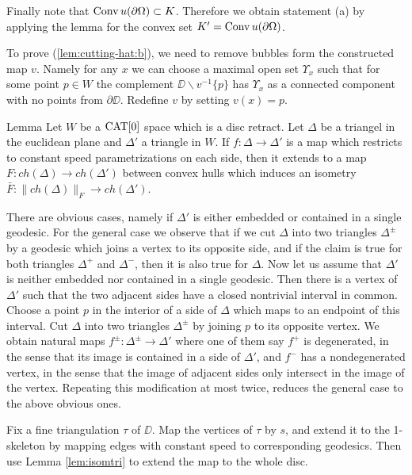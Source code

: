 \documentclass[a4paper,10pt]{amsart}
\begin{document}
Finally note that $\mathop{\rm Conv}\nolimits u(\partial\Omega)\subset K$. 
Therefore we obtain statement (a) 
by applying the lemma for the convex set $K'=\mathop{\rm Conv}\nolimits u(\partial\Omega)$.

To prove (\ref{lem:cutting-hat:b}), we need to remove bubbles form the constructed map $v$.
Namely for any $x$ we can choose a maximal open set $\Upsilon_x$ such that for some point $p\in W$ the complement $\DD\backslash v^{-1}\{p\}$ has $\Upsilon_x$ as a
connected component with no points from $\partial \DD$.
Redefine $v$ by setting $v(x)=p$.
\qeds

\begin{thm}{Lemma}\label{lem:isomtri}
Let $W$ be a $\mathop{\rm CAT}\nolimits[0]$ space which is a disc retract. Let $\Delta$ be a triangel in the euclidean plane
and $\Delta'$ a triangle in $W$. If $f:\Delta\to \Delta'$ is a map which restricts to constant speed
parametrizations on each side, then it extends to a map 
$F:ch(\Delta)\to ch(\Delta')$ between convex hulls which induces an isometry $\bar F:\|ch(\Delta)\|_F\to ch(\Delta')$. 
\end{thm}

There are obvious cases, namely if $\Delta'$ is either embedded or contained in a single geodesic. 
For the general case we observe that if we cut $\Delta$ into two triangles $\Delta^\pm$ by a geodesic which joins a vertex to its opposite side, and if 
the claim is true for both triangles $\Delta^+$ and $\Delta^-$, then it is also true for $\Delta$. Now let us assume that $\Delta'$ is neither embedded nor contained
in a single geodesic. Then there is a vertex of $\Delta'$ such that the two adjacent sides have a closed nontrivial interval in common. Choose a point $p$ in the interior
of a side of $\Delta$ which maps to an endpoint of this interval. Cut $\Delta$ into two triangles $\Delta^\pm$ by joining $p$ to its opposite vertex.
We obtain natural maps $f^\pm:\Delta^\pm\to\Delta'$ where one of them say $f^+$ is degenerated, in the sense that its image is contained in a side of $\Delta'$, and $f^-$ has 
a nondegenerated vertex, in the sense that the image of adjacent sides only intersect in the image of the vertex. Repeating this modification at most twice,
reduces the general case to the above obvious ones.
\qeds


Fix a fine triangulation $\tau$ of $\DD$.
Map the vertices of $\tau$ by $s$,
and extend it to the 1-skeleton by mapping edges with constant speed to 
corresponding geodesics. Then use Lemma \ref{lem:isomtri} to extend the map to the whole disc.
\end{document}
